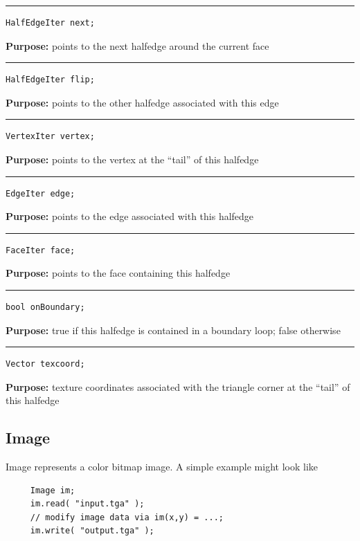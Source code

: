 \documentclass{article}
\begin{document}
\rule{5in}{1pt}
\begin{verbatim}
HalfEdgeIter next;
\end{verbatim}
\textbf{Purpose:}
points to the next halfedge around the current face

\hspace{-.21in}\rule{5in}{1pt}
\begin{verbatim}
HalfEdgeIter flip;
\end{verbatim}
\textbf{Purpose:}
points to the other halfedge associated with this edge

\hspace{-.21in}\rule{5in}{1pt}
\begin{verbatim}
VertexIter vertex;
\end{verbatim}
\textbf{Purpose:}
points to the vertex at the ``tail'' of this halfedge

\hspace{-.21in}\rule{5in}{1pt}
\begin{verbatim}
EdgeIter edge;
\end{verbatim}
\textbf{Purpose:}
points to the edge associated with this halfedge

\hspace{-.21in}\rule{5in}{1pt}
\begin{verbatim}
FaceIter face;
\end{verbatim}
\textbf{Purpose:}
points to the face containing this halfedge

\hspace{-.21in}\rule{5in}{1pt}
\begin{verbatim}
bool onBoundary;
\end{verbatim}
\textbf{Purpose:}
true if this halfedge is contained in a boundary
loop; false otherwise

\hspace{-.21in}\rule{5in}{1pt}
\begin{verbatim}
Vector texcoord;
\end{verbatim}
\textbf{Purpose:}
texture coordinates associated with the triangle corner at the
``tail'' of this halfedge
\pagebreak\subsection{Image}

 Image represents a color bitmap image.  A simple example might look like 

 \begin{verbatim}
     Image im;
     im.read( "input.tga" );
     // modify image data via im(x,y) = ...;
     im.write( "output.tga" );
 \end{verbatim}
\vspace{-\baselineskip}
\end{document}
